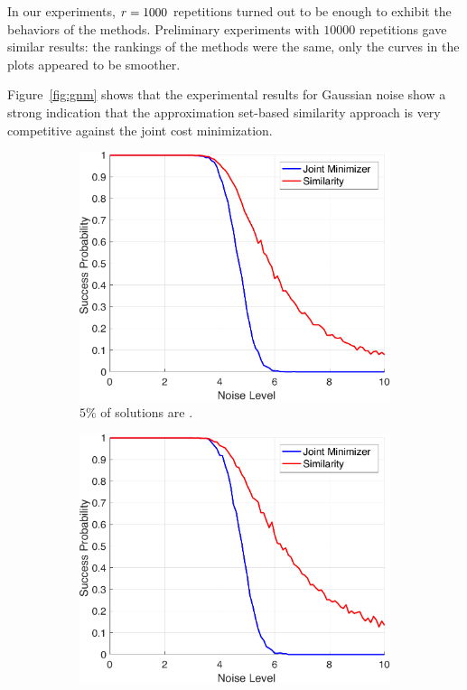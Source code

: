 In our experiments, $r=1000$ repetitions turned out to be enough to exhibit
the behaviors of the methods. Preliminary experiments with $10000$ repetitions
gave similar results: the rankings of the methods were the same, only the curves in
the plots appeared to be smoother.

Figure~\ref{fig:gnm} shows that the experimental results for
Gaussian noise show a strong indication that the approximation set-based similarity
approach is very competitive against the joint cost minimization.
\begin{figure}[t!]
  \centering
  \begin{subfigure}[b]{.49\textwidth}
      \includegraphics[width=\linewidth]{figures/ch_generic_approach/gnm_g50_b950}
      \caption{$5\%$ of solutions are \good.}
      \label{fig:gnm_5}
  \end{subfigure}
  \hfill
  \begin{subfigure}[b]{.49\textwidth}
      \includegraphics[width=\linewidth]{figures/ch_generic_approach/gnm_g100_b900}

\end{subfigure}
\end{figure}
